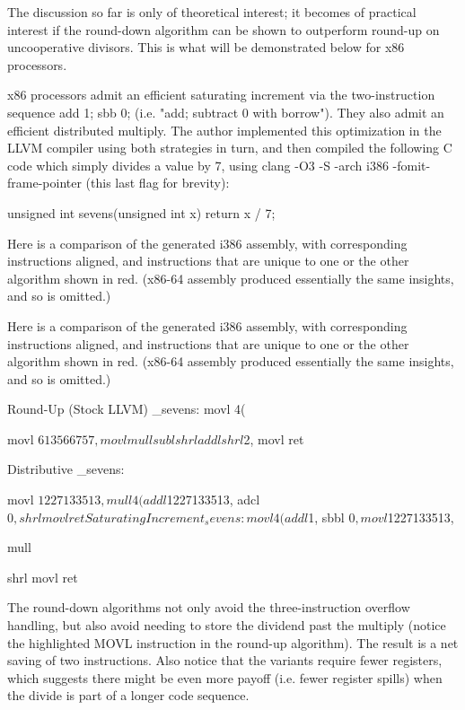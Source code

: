 The discussion so far is only of theoretical interest; it becomes of practical interest if the round-down algorithm can be shown to outperform round-up on uncooperative divisors. This is what will be demonstrated below for x86 processors.

x86 processors admit an efficient saturating increment via the two-instruction sequence add 1; sbb 0; (i.e. "add; subtract 0 with borrow"). They also admit an efficient distributed multiply. The author implemented this optimization in the LLVM compiler using both strategies in turn, and then compiled the following C code which simply divides a value by 7, using clang -O3 -S -arch i386 -fomit-frame-pointer (this last flag for brevity):

unsigned int sevens(unsigned int x) {
    return x / 7;
}

Here is a comparison of the generated i386 assembly, with corresponding instructions aligned, and instructions that are unique to one or the other algorithm shown in red. (x86-64 assembly produced essentially the same insights, and so is omitted.)

Here is a comparison of the generated i386 assembly, with corresponding instructions aligned, and instructions that are unique to one or the other algorithm shown in red. (x86-64 assembly produced essentially the same insights, and so is omitted.)

Round-Up (Stock LLVM)
_sevens:
  movl  4(%
  
  
  movl  $613566757, %
  movl  %
  mull  %
  subl  %
  shrl  %
  addl  %
  shrl  $2, %
  movl  %
  ret

Distributive
_sevens:



  movl  $1227133513, %

  mull  4(%
  addl  $1227133513, %
  adcl  $0, %
  
  shrl  %
  movl  %
  ret

Saturating Increment
_sevens:
  movl  4(%
  addl  $1, %
  sbbl  $0, %
  movl  $1227133513, %
  
  mull  %
  
  
  
  shrl  %
  movl  %
  ret

The round-down algorithms not only avoid the three-instruction overflow handling, but also avoid needing to store the dividend past the multiply (notice the highlighted MOVL instruction in the round-up algorithm). The result is a net saving of two instructions. Also notice that the variants require fewer registers, which suggests there might be even more payoff (i.e. fewer register spills) when the divide is part of a longer code sequence.

